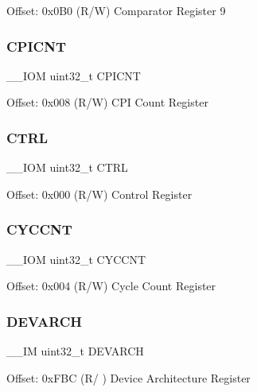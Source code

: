 Offset\+: 0x0\+B0 (R/W) Comparator Register 9 \mbox{\label{struct_d_w_t___type_a29ca657c77928334be08a2e6555be950}} 
\subsubsection{\texorpdfstring{CPICNT}{CPICNT}}
{\footnotesize\ttfamily \+\_\+\+\_\+\+I\+OM uint32\+\_\+t C\+P\+I\+C\+NT}

Offset\+: 0x008 (R/W) C\+PI Count Register \mbox{\label{struct_d_w_t___type_ac81efc171e9852a36caeb47122bfec5b}} 
\subsubsection{\texorpdfstring{CTRL}{CTRL}}
{\footnotesize\ttfamily \+\_\+\+\_\+\+I\+OM uint32\+\_\+t C\+T\+RL}

Offset\+: 0x000 (R/W) Control Register \mbox{\label{struct_d_w_t___type_a14822f5ad3426799332ac537d9293f3c}} 
\subsubsection{\texorpdfstring{CYCCNT}{CYCCNT}}
{\footnotesize\ttfamily \+\_\+\+\_\+\+I\+OM uint32\+\_\+t C\+Y\+C\+C\+NT}

Offset\+: 0x004 (R/W) Cycle Count Register \mbox{\label{struct_d_w_t___type_ae370aa5dc47fe03310e1d847333030e7}} 
\subsubsection{\texorpdfstring{DEVARCH}{DEVARCH}}
{\footnotesize\ttfamily \+\_\+\+\_\+\+IM uint32\+\_\+t D\+E\+V\+A\+R\+CH}

Offset\+: 0x\+F\+BC (R/ ) Device Architecture Register \mbox{\label{struct_d_w_t___type_afe0bbc124e53ad450abc72bfb56bd74f}} 
